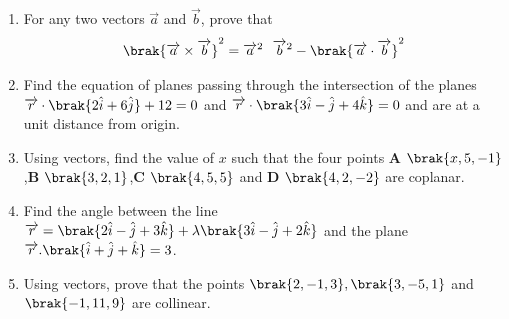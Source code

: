 \begin{enumerate}
\item For any two vectors $\overrightarrow{a}$ and $\overrightarrow{b}$, prove that
    \begin{align*}
    \brak{{\overrightarrow{a} \times \overrightarrow{b}}}^{2} = {\overrightarrow{a}^{2}}~~{\overrightarrow{b}^{2}} - \brak{{\overrightarrow{a} \cdot \overrightarrow{b}}}^{2} 
    \end{align*}

\item Find the equation of planes passing through the intersection  of the planes $\overrightarrow{r} \cdot \brak{2\hat{i}+6\hat{j}}+12=0$ and $\overrightarrow{r} \cdot \brak{3\hat{i}-\hat{j}+4\hat{k}}=0$ and are at a unit distance from origin.

\item Using vectors, find the value of $x$ such that the four points $\mathbf{A}$ $\brak{x,5,-1}$,$\mathbf{B}$ $\brak{3,2,1}$,$\mathbf{C}$ $\brak{4,5,5}$ and $\mathbf{D}$ $\brak{4,2,-2}$ are coplanar.

\item Find the angle between the line $\overrightarrow{r}=\brak{2\hat{i}-\hat{j}+3\hat{k}}+\lambda\brak{3\hat{i}-\hat{j}+2\hat{k}}$ and the plane $\overrightarrow{r}.\brak{\hat{i}+\hat{j}+\hat{k}}=3$.

\item Using vectors, prove that the points $\brak{2,-1,3},\brak{3,-5,1}$ and $\brak{-1,11,9}$ are collinear.



\end{enumerate}
